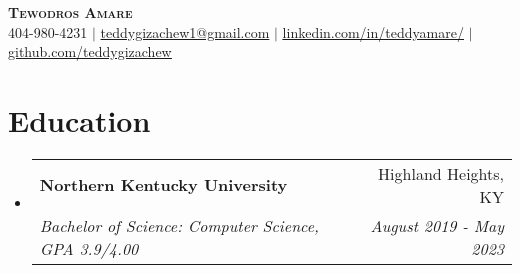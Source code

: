 \documentclass[letterpaper,11pt]{article}
\makeatletter
\newcommand{\resumeSubheading}[4]{
  \vspace{-2pt}\item
    \begin{tabular*}{0.97\textwidth}[t]{l@{\extracolsep{\fill}}r}
      \textbf{#1} & #2 \\
      \textit{\small#3} & \textit{\small #4} \\
    \end{tabular*}\vspace{-9pt}
}
\newcommand{\resumeSubHeadingListStart}{\begin{itemize}[leftmargin=0.15in, label={}]}
\newcommand{\resumeSubHeadingListEnd}{\end{itemize}}
\makeatother
\begin{document}


\begin{center}
    \textbf{\Large \scshape Tewodros Amare} \\ \vspace{1pt}
    \small 404-980-4231 $|$ \href{mailto:teddygizachew1@gmail.com}{teddygizachew1@gmail.com} $|$ 
    \href{https://www.linkedin.com/in/teddyamare/}{\underline{linkedin.com/in/teddyamare/}} $|$
    \href{https://github.com/teddygizachew}{\underline{github.com/teddygizachew}}
\end{center}

\section{Education}
  \resumeSubHeadingListStart
    \resumeSubheading
      {Northern Kentucky University}{Highland Heights, KY}
      {Bachelor of Science: Computer Science, GPA 3.9/4.00}{August 2019 - May 2023}
  \resumeSubHeadingListEnd
\end{document}

